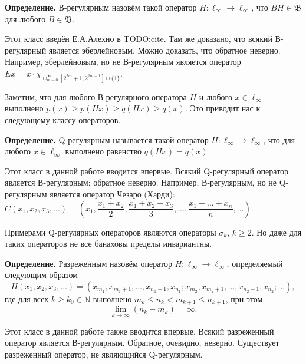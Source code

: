 \documentclass[a4paper,14pt]{article}
\begin{document}
\textbf{Определение.}
В-регулярным назовём такой оператор $H:\ell_\infty \to \ell_\infty$,
что $B H \in \mathfrak B$ для любого $B\in \mathfrak B$.

Этот класс введён Е.А.Алехно в
TODO:cite.
Там же доказано, что всякий В-регулярный является эберлейновым.
Можно доказать, что обратное неверно.
Например, эберлейновым, но не В-регулярным является оператор
$
	Ex = x \cdot \chi_{\cup_{m=0}^{\infty}\left[2^{2 m}+1, 2^{2 m+1}\right] \cup\{1\}}
$.

Заметим, что для любого В-регулярного оператора $H$ и любого $x\in \ell_\infty$ выполнено
$p(x) \geq p(Hx) \geq q(Hx) \geq q(x)$.
Это приводит нас к следующему классу операторов.

\textbf{Определение.} Q-регулярным называется такой оператор $H:\ell_\infty\to \ell_\infty$,
что для любого $x\in\ell_\infty$ выполнено равенство $q(Hx) = q(x)$.


Этот класс в данной работе вводится впервые.
Всякий Q-регулярный оператор является В-регулярным;
обратное неверно.
Например, В-регулярным, но не Q-регулярным является оператор Чезаро (Харди):
$
	C (x_1, x_2, x_3, ...) = \left(
	x_1,
	\dfrac{x_1+x_2}2,
	\dfrac{x_1+x_2 + x_3}3,
	...,
	\dfrac{x_1+...+x_n}n,
	...\right)
	.
$


Примерами Q-регулярных операторов являются операторы $\sigma_k$, $k\ge 2$.
Но даже для таких операторов не все банаховы пределы инвариантны.

\textbf{Определение.}
Разреженным назовём оператор $H: \ell_\infty \to \ell_\infty$,
определяемый следующим образом
$$
H(x_1, x_2, x_3, \ldots) = (x_{m_1}, x_{m_1 + 1}, \ldots, x_{n_1 - 1}, x_{n_1};
x_{m_2}, x_{m_2 + 1}, \ldots, x_{n_2 - 1}, x_{n_2}; \ldots),
$$
где для всех
$k \geqslant k_0 \in \mathbb N$
выполнено
$
	m_k \leqslant n_k < m_{k+1}\leqslant n_{k+1}
$,
при этом
$$
	\lim\limits_{k \to \infty} (n_k - m_k) = \infty
	.
$$

Этот класс в данной работе также вводится впервые.
Всякий разреженный оператор является В-регулярным.
Обратное, очевидно, неверно.
Существует разреженный оператор, не являющийся Q-регулярным.


\setcounter{equation}{0}
\setcounter{figure}{0}
\end{document}
